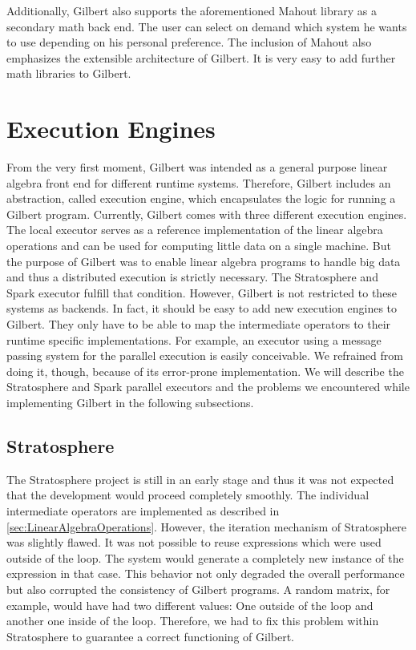 Additionally, Gilbert also supports the aforementioned Mahout library as a secondary math back end.
The user can select on demand which system he wants to use depending on his personal preference.
The inclusion of Mahout also emphasizes the extensible architecture of Gilbert.
It is very easy to add further math libraries to Gilbert.

\section{Execution Engines}

From the very first moment, Gilbert was intended as a general purpose linear algebra front end for different runtime systems.
Therefore, Gilbert includes an abstraction, called execution engine, which encapsulates the logic for running a Gilbert program.
Currently, Gilbert comes with three different execution engines.
The local executor serves as a reference implementation of the linear algebra operations and can be used for computing little data on a single machine.
But the purpose of Gilbert was to enable linear algebra programs to handle big data and thus a distributed execution is strictly necessary.
The Stratosphere and Spark executor fulfill that condition.
However, Gilbert is not restricted to these systems as backends.
In fact, it should be easy to add new execution engines to Gilbert.
They only have to be able to map the intermediate operators to their runtime specific implementations.
For example, an executor using a message passing system for the parallel execution is easily conceivable.
We refrained from doing it, though, because of its error-prone implementation.
We will describe the Stratosphere and Spark parallel executors and the problems we encountered while implementing Gilbert in the following subsections.

\subsection{Stratosphere}

The Stratosphere project is still in an early stage and thus it was not expected that the development would proceed completely smoothly.
The individual intermediate operators are implemented as described in \cref{sec:LinearAlgebraOperations}.
However, the iteration mechanism of Stratosphere was slightly flawed.
It was not possible to reuse expressions which were used outside of the loop.
The system would generate a completely new instance of the expression in that case.
This behavior not only degraded the overall performance but also corrupted the consistency of Gilbert programs.
A random matrix, for example, would have had two different values: One outside of the loop and another one inside of the loop.
Therefore, we had to fix this problem within Stratosphere to guarantee a correct functioning of Gilbert.

